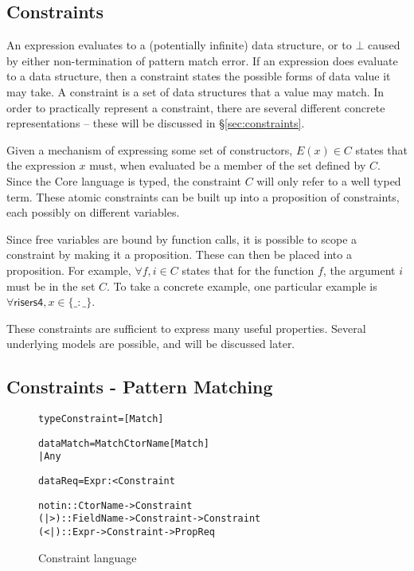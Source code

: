 \documentclass[preprint]{sigplanconf}
\newcommand{\C}[1]{\textsf{#1}}
\newenvironment{code}{\begin{alltt}\small}{\end{alltt}}
\newcommand{\g}[1]{\{#1\}} %
\begin{document}
\subsection{Constraints}

An expression evaluates to a (potentially infinite) data structure, or to $\bot{}$ caused by either non-termination of pattern match error. If an expression does evaluate to a data structure, then a constraint states the possible forms of data value it may take. A constraint is a set of data structures that a value may match. In order to practically represent a constraint, there are several different concrete representations -- these will be discussed in \S\ref{sec:constraints}.

Given a mechanism of expressing some set of constructors, $E(x) \in C$ states that the expression $x$ must, when evaluated be a member of the set defined by $C$. Since the Core language is typed, the constraint $C$ will only refer to a well typed term. These atomic constraints can be built up into a proposition of constraints, each possibly on different variables.

Since free variables are bound by function calls, it is possible to scope a constraint by making it a proposition. These can then be placed into a proposition. For example, $\forall f, i \in C$ states that for the function $f$, the argument $i$ must be in the set $C$. To take a concrete example, one particular example is $\forall \C{risers4}, x \in \g{\_ : \_}$.

These constraints are sufficient to express many useful properties. Several underlying models are possible, and will be discussed later.

\subsection{Constraints - Pattern Matching}

\begin{figure}
\begin{code}
type Constraint = [Match]

data Match  =  Match CtorName [Match]
            |  Any

data Req = Expr :< Constraint

notin :: CtorName -> Constraint
(|>) :: FieldName -> Constraint -> Constraint
(<|) :: Expr -> Constraint -> Prop Req
\end{code}
\caption{Constraint language}
\label{fig:constraint}
\end{figure}
\end{document}
